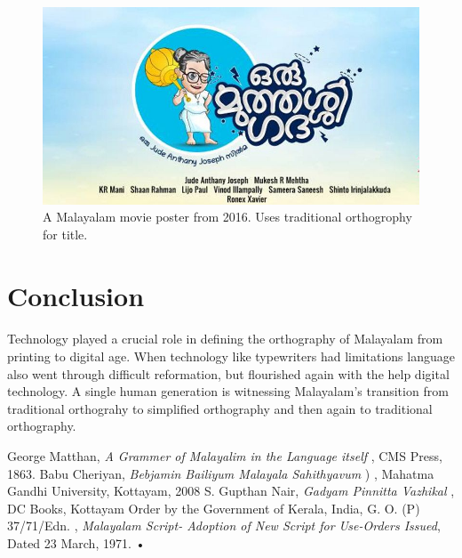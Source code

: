 \documentclass[10pt]{article}
\begin{document}
\begin{figure}[H]
 \centering
  \includegraphics[width=1.0\textwidth]{images/2016-oru-muthashi-gadha}
 \caption{A Malayalam movie poster from 2016. Uses traditional orthogrophy for title.}
\end{figure}

\section{Conclusion}

\paragraph{}
Technology played a crucial role in defining the orthography of Malayalam from printing to digital age. When technology like typewriters had limitations language also went through difficult reformation, but flourished again with the help digital technology. A single human generation is witnessing Malayalam's transition from traditional orthograhy to simplified orthography and then again to traditional orthography.

\begin{thebibliography}{9}
 George Matthan, \textit{A Grammer of Malayalim in the Language itself }, CMS Press, 1863.
 Babu Cheriyan, \textit{Bebjamin Bailiyum Malayala Sahithyavum} {) }, Mahatma Gandhi University, Kottayam, 2008
 S. Gupthan Nair, \textit{Gadyam Pinnitta Vazhikal}{ }, DC Books, Kottayam
 Order by the Government of Kerala, India, G. O. (P) 37/71/Edn. , \textit{Malayalam Script- Adoption of New Script for Use-Orders Issued}, Dated 23 March, 1971.
•


\end{thebibliography}
\end{document}
